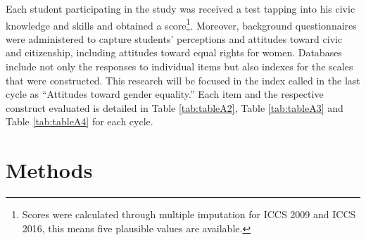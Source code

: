 \documentclass[12pt,twoside]{reedthesis}
\begin{document}
Each student participating in the study was received a test tapping into his civic knowledge and skills and obtained a score\footnote{Scores were calculated through multiple imputation for ICCS 2009 and ICCS 2016, this means five plausible values are available.}. Moreover, background questionnaires were administered to capture students' perceptions and attitudes toward civic and citizenship, including attitudes toward equal rights for women. Databases include not only the responses to individual items but also indexes for the scales that were constructed. This research will be focused in the index called in the last cycle as ``Attitudes toward gender equality.'' Each item and the respective construct evaluated is detailed in Table \ref{tab:tableA2}, Table \ref{tab:tableA3} and Table \ref{tab:tableA4} for each cycle.

\hypertarget{methods}{%
\chapter{Methods}\label{methods}}
\end{document}
